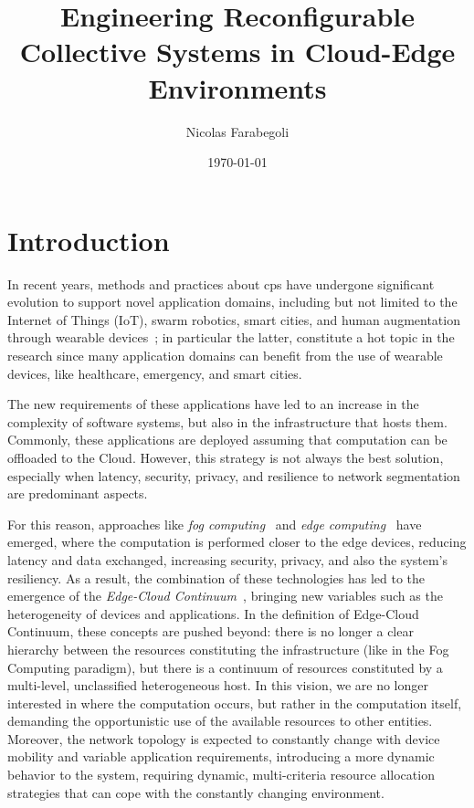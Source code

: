 \documentclass[12pt,a4paper]{article}
\title{Engineering Reconfigurable Collective Systems in Cloud-Edge Environments}
\author{Nicolas Farabegoli}
\date{\today}
\begin{document}
\maketitle

\section{Introduction}\label{sec:introduction}

In recent years,
methods and practices about \ac{cps} have undergone significant evolution to support novel application domains,
including but not limited to the Internet of Things (IoT),
swarm robotics, smart cities, and human augmentation through wearable devices~\cite{DBLP:conf/aisi/JumaS19, DBLP:journals/sensors/LosetoSRGIFBL22};
in particular the latter,
constitute a hot topic in the research since many application domains can benefit from the use of wearable devices,
like healthcare, emergency, and smart cities.

The new requirements of these applications have led to an increase in the complexity of software systems,
but also in the infrastructure that hosts them.
%
Commonly,
these applications are deployed assuming that computation can be offloaded to the Cloud.
%
However,
this strategy is not always the best solution,
especially when latency, security, privacy, and resilience to network segmentation are predominant aspects.

For this reason,
approaches like \emph{fog computing}~\cite{DBLP:journals/tjs/GasmiDTO22} and \emph{edge computing}~\cite{DBLP:journals/csur/KongTHCWJZKD23} have emerged,
where the computation is performed closer to the edge devices,
reducing latency and data exchanged, increasing security, privacy,
and also the system's resiliency.
%
As a result,
the combination of these technologies has led to the emergence of the \emph{Edge-Cloud Continuum}~\cite{DBLP:journals/iot/BittencourtISFM18},
bringing new variables such as the heterogeneity of devices and applications.
%
In the definition of Edge-Cloud Continuum,
these concepts are pushed beyond:
there is no longer a clear hierarchy between the resources constituting the infrastructure (like in the Fog Computing paradigm),
but there is a continuum of resources constituted by a multi-level, unclassified heterogeneous host.
%
In this vision,
we are no longer interested in where the computation occurs,
but rather in the computation itself,
demanding the opportunistic use of the available resources to other entities.
%
Moreover,
the network topology is expected to constantly change with device mobility and variable application requirements,
introducing a more dynamic behavior to the system,
requiring dynamic,
multi-criteria resource allocation strategies that can cope with the constantly changing environment.
\end{document}
